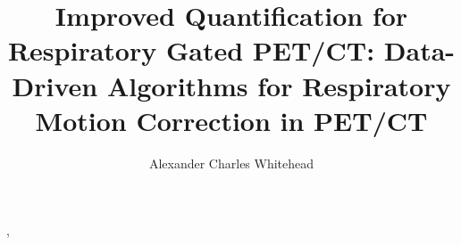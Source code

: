\title{Improved Quantification for Respiratory Gated PET/CT: Data-Driven Algorithms for Respiratory Motion Correction in PET/CT}
\author{Alexander Charles Whitehead}

\maketitle
\makedeclaration

 \epigraph{\textit{}}{, \textit{}}

\begin{abstract}
    \blindtext
\end{abstract}

\begin{impactstatement}
    \begin{quote}
        \blindtext
    \end{quote}
\end{impactstatement}

\begin{acknowledgements}
    \blindtext
\end{acknowledgements}

\tableofcontents
\listoffigures
\listoftables
\printglossaries
